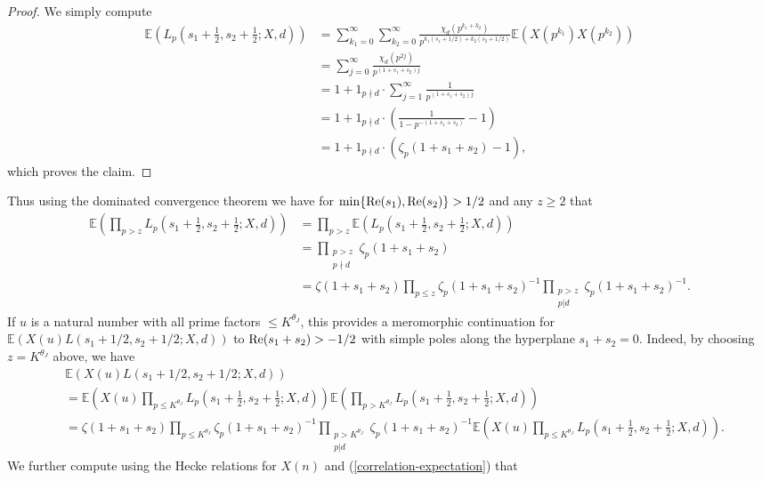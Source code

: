 \documentclass[a4paper,10pt,twoside]{amsart}
\theoremstyle{definition}
\numberwithin{equation}{section}
\renewcommand{\Re}{\textnormal{Re}}
\renewcommand\:{\colon}
\begin{document}
\begin{proof}
We simply compute
\begin{align*}
\mathbb E\left(L_p\left(s_1+\frac12,s_2+\frac12;X,d\right)\right)&=\sum_{k_1=0}^\infty\sum_{k_2=0}^\infty\frac{\chi_d(p^{k_1+k_2})}{p^{k_1(s_1+1/2)+k_2(s_2+1/2)}}\mathbb E\left(X(p^{k_1})X(p^{k_2})\right)\\
&=\sum_{j=0}^\infty\frac{\chi_d(p^{2j})}{p^{(1+s_1+s_2)j}}\\
&=1+1_{p\nmid d}\cdot\sum_{j=1}^\infty\frac1{p^{(1+s_1+s_2)j}}\\
&=1+1_{p\nmid d}\cdot\left(\frac1{1-p^{-(1+s_1+s_2)}}-1\right)\\
&=1+1_{p\nmid d}\cdot\left(\zeta_p(1+s_1+s_2)-1\right),
\end{align*}
which proves the claim.
\end{proof}
\noindent Thus using the dominated convergence theorem we have for $\min\{\Re(s_1),\Re(s_2)\}>1/2$ and any $z\geq 2$ that
\begin{align*}
\mathbb E\left(\prod_{p>z}L_p\left(s_1+\frac12,s_2+\frac12;X,d\right)\right)&=\prod_{p>z}\mathbb E\left(L_p\left(s_1+\frac12,s_2+\frac12;X,d\right)\right)\\
&=\prod_{\substack{p>z\\
p\nmid d}}\zeta_p(1+s_1+s_2)\\
&=\zeta(1+s_1+s_2)\prod_{p\leq z}\zeta_p(1+s_1+s_2)^{-1}\prod_{\substack{p>z\\
p|d}}\zeta_p(1+s_1+s_2)^{-1}. 
\end{align*}
If $u$ is a natural number with all prime factors $\leq K^{\theta_J}$, this provides a meromorphic continuation for $\mathbb E(X(u)L(s_1+1/2,s_2+1/2;X,d))$ to $\Re(s_1+s_2)>-1/2$ with simple poles along the hyperplane $s_1+s_2=0$. Indeed, by choosing $z=K^{\theta_J}$ above, we have
\begin{align}\label{twisted-exp}
&\mathbb E\left(X(u)L(s_1+1/2,s_2+1/2;X,d)\right) \nonumber\\
&=\mathbb E\left(X(u)\prod_{p\leq K^{\theta_J}}L_p\left(s_1+\frac12,s_2+\frac12;X,d\right)\right)\mathbb E\left(\prod_{p>K^{\theta_J}}L_p\left(s_1+\frac12,s_2+\frac12;X,d\right)\right)\nonumber\\
&=\zeta(1+s_1+s_2)\prod_{p\leq K^{\theta_J}}\zeta_p(1+s_1+s_2)^{-1}\prod_{\substack{p>K^{\theta_J}\\
p|d}}\zeta_p(1+s_1+s_2)^{-1}\mathbb E\left(X(u)\prod_{p\leq K^{\theta_J}}L_p\left(s_1+\frac12,s_2+\frac12;X,d\right)\right).
\end{align} 
We further compute using the Hecke relations for $X(n)$ and (\ref{correlation-expectation}) that 
\end{document}
